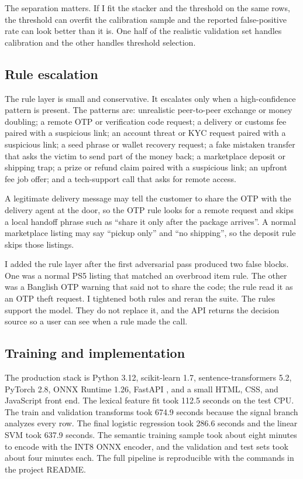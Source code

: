 \documentclass[11pt]{article}
\begin{document}
The separation matters. If I fit the stacker and the threshold on the same rows, the threshold can overfit the calibration sample and the reported false-positive rate can look better than it is. One half of the realistic validation set handles calibration and the other handles threshold selection.

\subsection{Rule escalation}

The rule layer is small and conservative. It escalates only when a high-confidence pattern is present. The patterns are: unrealistic peer-to-peer exchange or money doubling; a remote OTP or verification code request; a delivery or customs fee paired with a suspicious link; an account threat or KYC request paired with a suspicious link; a seed phrase or wallet recovery request; a fake mistaken transfer that asks the victim to send part of the money back; a marketplace deposit or shipping trap; a prize or refund claim paired with a suspicious link; an upfront fee job offer; and a tech-support call that asks for remote access.

A legitimate delivery message may tell the customer to share the OTP with the delivery agent at the door, so the OTP rule looks for a remote request and skips a local handoff phrase such as ``share it only after the package arrives''. A normal marketplace listing may say ``pickup only'' and ``no shipping'', so the deposit rule skips those listings.

I added the rule layer after the first adversarial pass produced two false blocks. One was a normal PS5 listing that matched an overbroad item rule. The other was a Banglish OTP warning that said not to share the code; the rule read it as an OTP theft request. I tightened both rules and reran the suite. The rules support the model. They do not replace it, and the API returns the decision source so a user can see when a rule made the call.

\subsection{Training and implementation}

The production stack is Python 3.12, scikit-learn 1.7, sentence-transformers 5.2, PyTorch 2.8, ONNX Runtime 1.26, FastAPI \cite{fastapi}, and a small HTML, CSS, and JavaScript front end. The lexical feature fit took 112.5 seconds on the test CPU. The train and validation transforms took 674.9 seconds because the signal branch analyzes every row. The final logistic regression took 286.6 seconds and the linear SVM took 637.9 seconds. The semantic training sample took about eight minutes to encode with the INT8 ONNX encoder, and the validation and test sets took about four minutes each. The full pipeline is reproducible with the commands in the project README.
\end{document}
